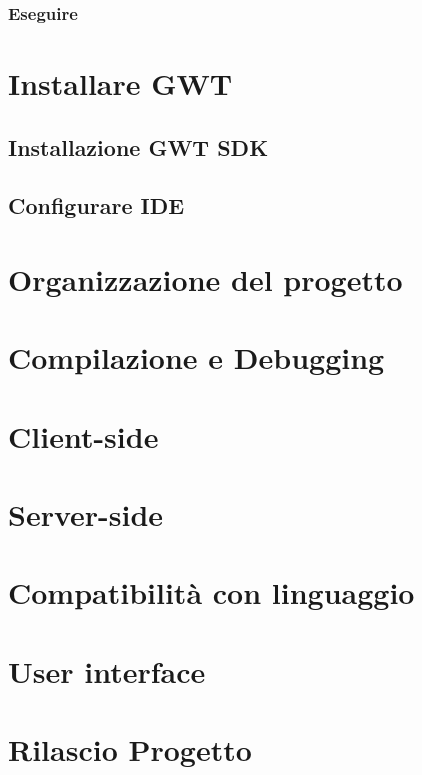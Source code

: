 		\subsubsection{Eseguire}
		
\section{Installare GWT}
	  \subsection{Installazione GWT SDK}
	  \subsection{Configurare IDE}
\section{Organizzazione del progetto}
\section{Compilazione e Debugging}
\section{Client-side}
\section{Server-side}
\section{Compatibilità con linguaggio}
\section{User interface}
\section{Rilascio Progetto}